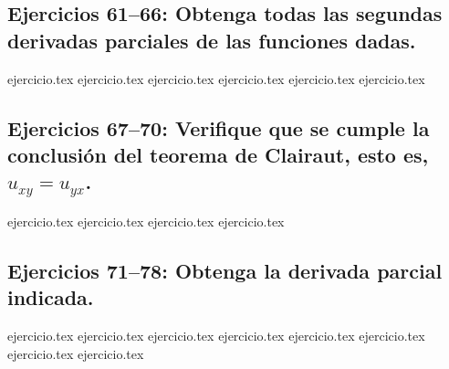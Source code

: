 \subsection*{Ejercicios 61--66: Obtenga todas las segundas derivadas parciales de las funciones dadas.}
\begin{enumerate}
    \setcounter{enumi}{60}
    {ejercicio.tex}
    {ejercicio.tex}
    {ejercicio.tex}
    {ejercicio.tex}
    {ejercicio.tex}
    {ejercicio.tex}
\end{enumerate}

\subsection*{Ejercicios 67--70: Verifique que se cumple la conclusión del teorema de Clairaut, esto es, $u_{xy} = u_{yx}$.}
\begin{enumerate}
    \setcounter{enumi}{66}
    {ejercicio.tex}
    {ejercicio.tex}
    {ejercicio.tex}
    {ejercicio.tex}
\end{enumerate}

\subsection*{Ejercicios 71--78: Obtenga la derivada parcial indicada.}
\begin{enumerate}
    \setcounter{enumi}{70}
    {ejercicio.tex}
    {ejercicio.tex}
    {ejercicio.tex}
    {ejercicio.tex}
    {ejercicio.tex}
    {ejercicio.tex}
    {ejercicio.tex}
    {ejercicio.tex}
\end{enumerate}

